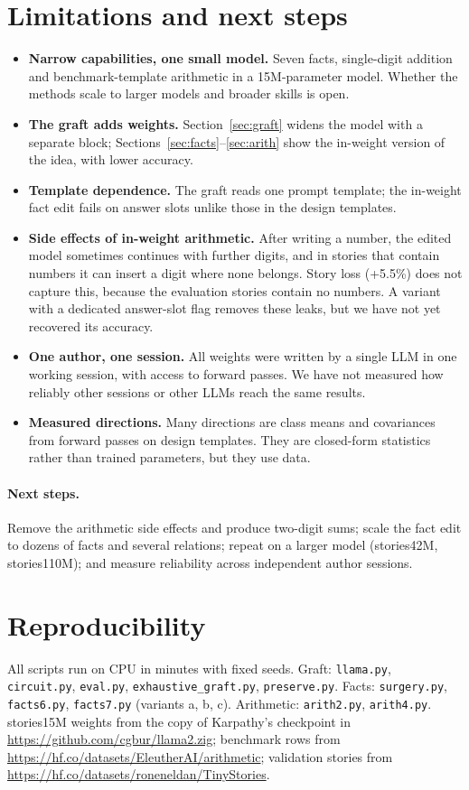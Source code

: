 \documentclass[11pt]{article}
\begin{document}
\section{Limitations and next steps}
\begin{itemize}[leftmargin=*]
\item \textbf{Narrow capabilities, one small model.} Seven facts, single-digit addition and benchmark-template arithmetic in a 15M-parameter model. Whether the methods scale to larger models and broader skills is open.
\item \textbf{The graft adds weights.} Section~\ref{sec:graft} widens the model with a separate block; Sections~\ref{sec:facts}--\ref{sec:arith} show the in-weight version of the idea, with lower accuracy.
\item \textbf{Template dependence.} The graft reads one prompt template; the in-weight fact edit fails on answer slots unlike those in the design templates.
\item \textbf{Side effects of in-weight arithmetic.} After writing a number, the edited model sometimes continues with further digits, and in stories that contain numbers it can insert a digit where none belongs. Story loss (+5.5\%) does not capture this, because the evaluation stories contain no numbers. A variant with a dedicated answer-slot flag removes these leaks, but we have not yet recovered its accuracy.
\item \textbf{One author, one session.} All weights were written by a single LLM in one working session, with access to forward passes. We have not measured how reliably other sessions or other LLMs reach the same results.
\item \textbf{Measured directions.} Many directions are class means and covariances from forward passes on design templates. They are closed-form statistics rather than trained parameters, but they use data.
\end{itemize}
\paragraph{Next steps.} Remove the arithmetic side effects and produce two-digit sums; scale the fact edit to dozens of facts and several relations; repeat on a larger model (stories42M, stories110M); and measure reliability across independent author sessions.

\section*{Reproducibility}\sloppy
All scripts run on CPU in minutes with fixed seeds. Graft: \texttt{llama.py}, \texttt{circuit.py}, \texttt{eval.py}, \texttt{exhaustive\_graft.py}, \texttt{preserve.py}. Facts: \texttt{surgery.py}, \texttt{facts6.py}, \texttt{facts7.py} (variants a, b, c). Arithmetic: \texttt{arith2.py}, \texttt{arith4.py}. stories15M weights from the copy of Karpathy's checkpoint in \url{https://github.com/cgbur/llama2.zig}; benchmark rows from \url{https://hf.co/datasets/EleutherAI/arithmetic}; validation stories from \url{https://hf.co/datasets/roneneldan/TinyStories}.
\end{document}
